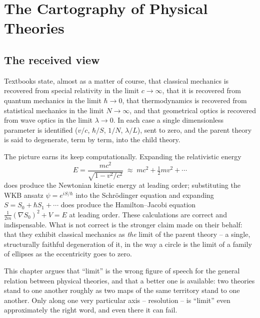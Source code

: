 %

\chapter{The Cartography of Physical Theories}
\label{ch:cartography}

\section{The received view}
\label{sec:received-view}

Textbooks state, almost as a matter of course, that classical mechanics is recovered from special relativity in the limit $c\to\infty$, that it is recovered from quantum mechanics in the limit $\hbar\to 0$, that thermodynamics is recovered from statistical mechanics in the limit $N\to\infty$, and that geometrical optics is recovered from wave optics in the limit $\lambda\to 0$. In each case a single dimensionless parameter is identified ($v/c$, $\hbar/S$, $1/N$, $\lambda/L$), sent to zero, and the parent theory is said to degenerate, term by term, into the child theory.

The picture earns its keep computationally. Expanding the relativistic energy
\[
E=\frac{mc^2}{\sqrt{1-v^2/c^2}} \;\approx\; mc^2+\tfrac12 mv^2+\cdots
\]
does produce the Newtonian kinetic energy at leading order; substituting the WKB ansatz $\psi=e^{iS/\hbar}$ into the Schr\"odinger equation and expanding $S=S_0+\hbar S_1+\cdots$ does produce the Hamilton--Jacobi equation $\tfrac{1}{2m}(\nabla S_0)^2+V=E$ at leading order. These calculations are correct and indispensable. What is not correct is the stronger claim made on their behalf: that they exhibit classical mechanics as \emph{the} limit of the parent theory -- a single, structurally faithful degeneration of it, in the way a circle is the limit of a family of ellipses as the eccentricity goes to zero.

This chapter argues that ``limit'' is the wrong figure of speech for the general relation between physical theories, and that a better one is available: two theories stand to one another roughly as two maps of the same territory stand to one another. Only along one very particular axis -- resolution -- is ``limit'' even approximately the right word, and even there it can fail.

